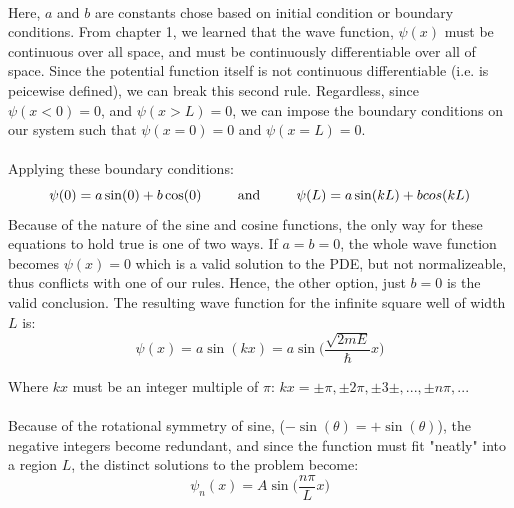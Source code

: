 \documentclass[12pt,letterpaper]{book}
\begin{document}
\paragraph*{}Here, $a$ and $b$ are constants chose based on initial condition or boundary conditions. From chapter 1, we learned that the wave function, 
$\psi(x)$ must be continuous over all space, and must be continuously differentiable over all of space. Since the potential function itself is not continuous differentiable (i.e. is peicewise defined), we can break this second rule. Regardless, since $\psi(x<0) = 0 $, and $\psi(x > L) = 0$, we can impose the boundary conditions on our system such that $\psi(x=0) = 0$ and $\psi(x=L) = 0$.
\paragraph*{}Applying these boundary conditions:
\begin{equation}
\psi(0) = a \sin(0) + b \cos(0) 
\text{\hspace*{8mm} and \hspace*{8mm}}
\psi(L) = a \sin(kL) + b \\cos(kL)
\end{equation}
Because of the nature of the sine and cosine functions, the only way for these equations to hold true is one of two ways. If $a = b = 0$, the whole wave function becomes $\psi(x) = 0$ which is a valid solution to the PDE, but not normalizeable, thus conflicts with one of our rules. Hence, the other option, just $b = 0$ is the valid conclusion. The resulting wave function for the infinite square well of width $L$ is:
\begin{equation}
\psi(x) = a \sin(kx) = a \sin\big(\frac{\sqrt{2mE}}{\hbar}x\big)
\end{equation}
\begin{flushright}
Where $kx$ must be an integer multiple of $\pi$: $kx = \pm \pi , \pm 2\pi , \pm 3\pm , ... , \pm n\pi , ...$ 
\end{flushright}
\paragraph*{}Because of the rotational symmetry of sine, ($-\sin(\theta) = +\sin(\theta)$), the negative integers become redundant, and since the function must fit "neatly" into a region $L$, the distinct solutions to the problem become:
\begin{equation}
\label{ISW spatial solution}
\psi_n(x) = A\sin \Big( \frac{n\pi}{L}x \Big)
\end{equation}
\end{document}
